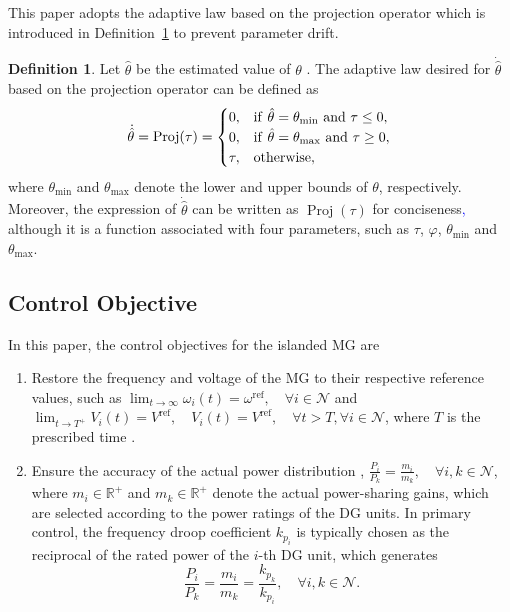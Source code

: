 \documentclass[]{interact}
\theoremstyle{plain}%
\theoremstyle{definition}
\newtheorem{definition}{Definition}
\theoremstyle{remark}
\begin{document}
This paper adopts the adaptive law based on the projection operator which is introduced in Definition~\ref{def:projection} to prevent parameter drift.
\begin{definition}
\label{def:projection}
Let $\hat{\theta}$ be the estimated value of $\theta$ \citep{Wei2024}. The adaptive law desired for $\dot{\hat{\theta}}$ based on the projection operator can be defined as
\begin{equation}
\label{eq:proj}
\dot{\hat{\theta}} = \text{Proj}(\tau) = 
\begin{cases} 
0, & {\rm{if}}~\hat{\theta} = \theta_{\min} \text{ and } \tau \leq 0, \\
0, & {\rm{if}}~\hat{\theta} = \theta_{\max} \text{ and } \tau \geq 0, \\
\tau, & \text{otherwise},
\end{cases}
\end{equation}
where $\theta_{\min}$ and $\theta_{\max}$ denote the lower and upper bounds of $\theta$, respectively. 
Moreover, the expression of $\dot{\hat{\theta}}$ can be written as $\operatorname{Proj}(\tau)$ for conciseness\textcolor{blue}{,} although it is a function associated with four parameters, such as $\tau$, $\varphi$, $\theta_{\min}$ and $\theta_{\max}$.  
\end{definition}

\subsection{Control Objective}

In this paper, the control objectives for the islanded MG are
\begin{enumerate}
\item Restore the frequency and voltage of the MG to their respective reference values, such as $\lim_{t \to \infty} \omega_i(t) = \omega^{\text{ref}}, \quad \forall i \in \mathcal{N}$ and $\lim_{t \to T^+} V_i(t) = V^{\text{ref}}, \quad V_i(t) = V^{\text{ref}}, \quad \forall t > T, \forall i \in \mathcal{N}$, where $T$ is the prescribed time \citep{Mohamed2020}.

\item Ensure the accuracy of the actual power distribution \citep{Qian2025,Salman2024}, $\frac{P_i}{P_k} = \frac{m_i}{m_k}, \quad \forall i,k \in \mathcal{N}$, where $m_i\in \mathbb{R}^+$ and $m_k \in \mathbb{R}^+$ denote the actual power-sharing gains, 
which are selected according to the power ratings of the DG units. 
In primary control, the frequency droop coefficient $k_{p_i}$ 
is typically chosen as the reciprocal of the rated power of the $i$-th DG unit, which generates
\begin{equation}
\label{eq:21}
\frac{P_i}{P_k} = \frac{m_i}{m_k} = \frac{k_{p_k}}{k_{p_i}}, \quad \forall i,k \in \mathcal{N}.
\end{equation}
\end{enumerate}
\end{document}
